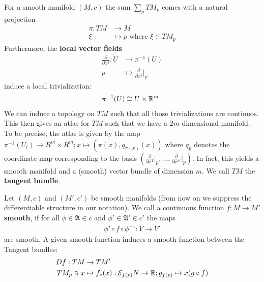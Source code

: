 \begin{definition}
    For a smooth manifold $(M,c)$ the sum $\sum_pTM_p$ comes with a natural projection 
    \begin{align*}
        \pi: TM &\to M \\
        \xi &\mapsto p \text{ where }\xi \in TM_p 
    \end{align*} Furthermore, the \textbf{local vector fields}
    \begin{align*}
        \frac{\partial}{\partial x^j}: U & \to \pi^{-1}(U) \\
        p &\mapsto \frac{\partial}{\partial x^j}\Big|_p
    \end{align*} induce a local trivialization:
    \begin{align*}
        \pi^{-1}(U)\cong U \times \mathbb{R}^m\, .
    \end{align*} We can induce a topology on $TM$ such that all those trivializations are continuos. This then gives an atlas for $TM$ such that we have a $2m$-dimensional manifold. To be precise, the atlas is given by the map $\pi^{-1}(U_i)\to R^m\times R^m; x\mapsto (\pi(x),q_{\pi(x)}(x))$ where $q_p$ denotes the coordinate map corresponding to the basis $(\frac{\partial}{\partial x^1}\big|_p,...,\frac{\partial}{\partial x^m}\big|_p)$. In fact, this yields a smooth manifold and a (smooth) vector bundle of dimension $m$. We call $TM$ the \textbf{tangent bundle}.
\end{definition}
\begin{definition}
    Let $(M,c)$ and $(M',c')$ be smooth manifolds (from now on we suppress the differentiable structure in our notation). We call a continuous function $f:M \to M'$ \textbf{smooth}, if for all $\phi\in \mathfrak{A}\in c$ and $\phi'\in \mathfrak{A}'\in c'$ the maps
    \begin{align*}
        \phi'\circ f\circ  \phi^{-1}:V\to V'
    \end{align*} are smooth. A given smooth function induces a smooth function between the Tangent bundles:
    \begin{align*}
        Df: TM &\to TM' \\
             TM_p\ni x&\mapsto f_*(x): \mathcal{E}_{f(p)}N\to \mathbb{R};  g_{f(p)}\mapsto x(g\circ f)
    \end{align*}
\end{definition}